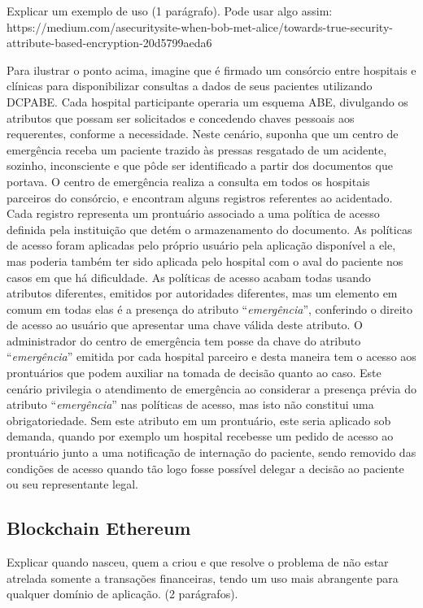 \documentclass[a4paper,11pt]{article}
\begin{document}
{\color{ForestGreen}Explicar um exemplo de uso (1 parágrafo). Pode usar algo assim: https://medium.com/asecuritysite-when-bob-met-alice/towards-true-security-attribute-based-encryption-20d5799aeda6}

Para ilustrar o ponto acima, imagine que é firmado um consórcio entre hospitais e clínicas para disponibilizar consultas a dados de seus pacientes utilizando DCPABE.
Cada hospital participante operaria um esquema ABE, divulgando os atributos que possam ser solicitados e concedendo chaves pessoais aos requerentes, conforme a necessidade.
Neste cenário, suponha que um centro de emergência receba um paciente trazido às pressas resgatado de um acidente, sozinho, inconsciente e que pôde ser identificado a partir dos documentos que portava.
O centro de emergência realiza a consulta em todos os hospitais parceiros do consórcio, e encontram alguns registros referentes ao acidentado.
Cada registro representa um prontuário associado a uma política de acesso definida pela instituição que detém o armazenamento do documento.
As políticas de acesso foram aplicadas pelo próprio usuário pela aplicação disponível a ele, mas poderia também ter sido aplicada pelo hospital com o aval do paciente nos casos em que há dificuldade.
As políticas de acesso acabam todas usando atributos diferentes, emitidos por autoridades diferentes, mas um elemento em comum em todas elas é a presença do atributo ``\emph{emergência}'', conferindo o direito de acesso ao usuário que apresentar uma chave válida deste atributo.
O administrador do centro de emergência tem posse da chave do atributo ``\emph{emergência}'' emitida por cada hospital parceiro e desta maneira tem o acesso aos prontuários que podem auxiliar na tomada de decisão quanto ao caso.
Este cenário privilegia o atendimento de emergência ao considerar a presença prévia do atributo ``\emph{emergência}'' nas políticas de acesso, mas isto não constitui uma obrigatoriedade.
Sem este atributo em um prontuário, este seria aplicado sob demanda, quando por exemplo um hospital recebesse um pedido de acesso ao prontuário junto a uma notificação de internação do paciente, sendo removido das condições de acesso quando tão logo fosse possível delegar a decisão ao paciente ou seu representante legal.

\subsection{Blockchain Ethereum}

{\color{ForestGreen}Explicar quando nasceu, quem a criou e que resolve o problema de não estar atrelada somente a transações financeiras, tendo um uso mais abrangente para qualquer domínio de aplicação. (2 parágrafos).}
\end{document}
